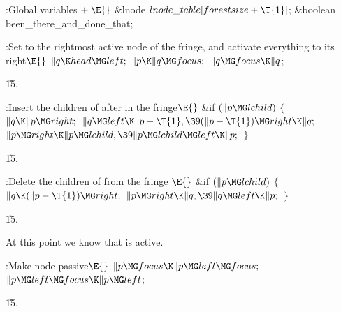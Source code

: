 \B{}:Global variables\X${}\mathrel+\E{}$\6
\&{lnode} ${}\\{lnode\_table}[\\{forestsize}+\T{1}]{}$;\6
\&{boolean} \\{been\_there\_and\_done\_that};\par
\fi

\B{}:Set  to the rightmost active node of
the fringe, and activate everything to its right\X${}\E{}$\6
$\|q\K\\{head}\MG\\{left};{}$\6
${}\|p\K\|q\MG\\{focus};{}$\6
${}\|q\MG\\{focus}\K\|q{}$;\par
\U15.\fi

\B{}:Insert the children of  after 
in the fringe\X${}\E{}$\6
\&{if} ${}(\|p\MG\\{lchild}){}$\5
${}\{{}$\1\6
${}\|q\K\|p\MG\\{right};{}$\6
${}\|q\MG\\{left}\K\|p-\T{1},\39(\|p-\T{1})\MG\\{right}\K\|q;{}$\6
${}\|p\MG\\{right}\K\|p\MG\\{lchild},\39\|p\MG\\{lchild}\MG\\{left}\K\|p;{}$\6
\4${}\}{}$\2\par
\U15.\fi

\B{}:Delete the children of  from the fringe%
\X${}\E{}$\6
\&{if} ${}(\|p\MG\\{lchild}){}$\5
${}\{{}$\1\6
${}\|q\K(\|p-\T{1})\MG\\{right};{}$\6
${}\|p\MG\\{right}\K\|q,\39\|q\MG\\{left}\K\|p;{}$\6
\4${}\}{}$\2\par
\U15.\fi

At this point we know that  is
active.

\Y\B\4:Make node  passive\X${}\E{}$\6
$\|p\MG\\{focus}\K\|p\MG\\{left}\MG\\{focus};{}$\6
${}\|p\MG\\{left}\MG\\{focus}\K\|p\MG\\{left}{}$;\par
\U15.\fi

